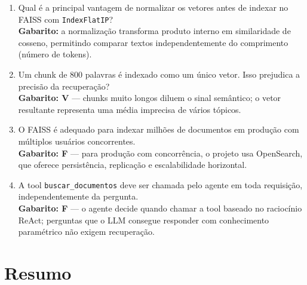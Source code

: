 \begin{enumerate}[leftmargin=*]
  \item Qual \'e a principal vantagem de normalizar os vetores antes
        de indexar no FAISS com \texttt{IndexFlatIP}? \\
        \textbf{Gabarito:} a normaliza\c{c}\~ao transforma produto
        interno em similaridade de cosseno, permitindo comparar
        textos independentemente do comprimento (n\'umero de tokens).

  \item Um chunk de 800 palavras \'e indexado como um \'unico vetor.
        Isso prejudica a precis\~ao da recupera\c{c}\~ao? \\
        \textbf{Gabarito: V} --- chunks muito longos diluem o sinal
        sem\^antico; o vetor resultante representa uma m\'edia
        imprecisa de v\'arios t\'opicos.

  \item O FAISS \'e adequado para indexar milh\~oes de documentos em
        produ\c{c}\~ao com m\'ultiplos usu\'arios concorrentes. \\
        \textbf{Gabarito: F} --- para produ\c{c}\~ao com
        concorr\^encia, o projeto usa OpenSearch, que oferece
        persist\^encia, replica\c{c}\~ao e escalabilidade horizontal.

  \item A tool \texttt{buscar\_documentos} deve ser chamada pelo agente
        em toda requisi\c{c}\~ao, independentemente da pergunta. \\
        \textbf{Gabarito: F} --- o agente decide quando chamar a tool
        baseado no racioc\'inio ReAct; perguntas que o LLM consegue
        responder com conhecimento param\'etrico n\~ao exigem recupera\c{c}\~ao.
\end{enumerate}

\section{Resumo}

